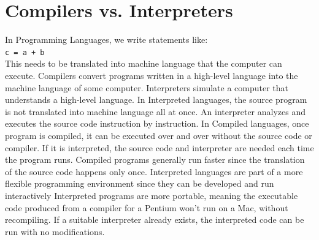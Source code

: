 \documentclass[12pt,a4paper,final,twoside,titlepage]{book}
\begin{document}
\section{Compilers vs. Interpreters}
In Programming Languages, we write statements like:\\
\texttt{c = a + b}\\
This needs to be translated into machine language that the computer can execute. Compilers convert programs written in a high-level language into the machine language of some computer. Interpreters simulate a computer that understands a high-level language. In Interpreted languages, the source program is not translated into machine language all at once. An interpreter analyzes and executes the source code instruction by instruction. In Compiled languages, once program is compiled, it can be executed over and over without the source code or compiler. If it is interpreted, the source code and interpreter are needed each time the program runs. Compiled programs generally run faster since the translation of the source code happens only once. Interpreted languages are part of a more flexible programming environment since they can be developed and run interactively
Interpreted programs are more portable, meaning the executable code produced from a compiler for a Pentium won’t run on a Mac, without recompiling. If a suitable interpreter already exists, the interpreted code can be run with no modifications.
\end{document}
